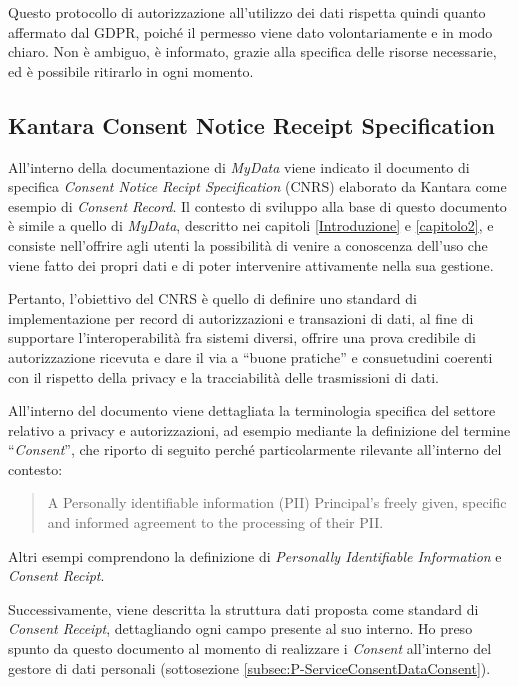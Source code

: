 Questo protocollo di autorizzazione all’utilizzo dei dati rispetta quindi quanto affermato dal GDPR, poich\'e il permesso viene dato volontariamente e in modo chiaro. Non \`e ambiguo, \`e informato, grazie alla specifica delle risorse necessarie, ed \`e possibile ritirarlo in ogni momento.

\subsection{Kantara Consent Notice Receipt Specification}
All’interno della documentazione di \textit{MyData} \cite{githubmydatastack} viene indicato il documento di specifica \textit{Consent Notice Recipt Specification} (CNRS) elaborato da Kantara \cite{kantaraconsent} come esempio di \textit{Consent Record}. Il contesto di sviluppo alla base di questo documento \`e simile a quello di \textit{MyData}, descritto nei capitoli \ref{Introduzione} e \ref{capitolo2}, e consiste nell’offrire agli utenti la possibilit\`a di venire a conoscenza dell’uso che viene fatto dei propri dati e di poter intervenire attivamente nella sua gestione.

Pertanto, l’obiettivo del CNRS \`e quello di definire uno standard di implementazione per record di autorizzazioni e transazioni di dati, al fine di supportare l’interoperabilit\`a fra sistemi diversi, offrire una prova credibile di autorizzazione ricevuta e dare il via a “buone pratiche” e consuetudini coerenti con il rispetto della privacy e la tracciabilit\`a delle trasmissioni di dati.

All’interno del documento viene dettagliata la terminologia specifica del settore relativo a privacy e autorizzazioni, ad esempio mediante la definizione del termine “\textit{Consent}”, che riporto di seguito perch\'e particolarmente rilevante all’interno del contesto:
\begin{quote}
A Personally identifiable information (PII) Principal’s freely given, specific and informed agreement to the processing of their PII.
\end{quote}
Altri esempi comprendono la definizione di \textit{Personally Identifiable Information} e \textit{Consent Recipt}.

Successivamente, viene descritta la struttura dati proposta come standard di \textit{Consent Receipt}, dettagliando ogni campo presente al suo interno. Ho preso spunto da questo documento al momento di realizzare i \textit{Consent} all’interno del gestore di dati personali (sottosezione \ref{subsec:P-ServiceConsentDataConsent}).

